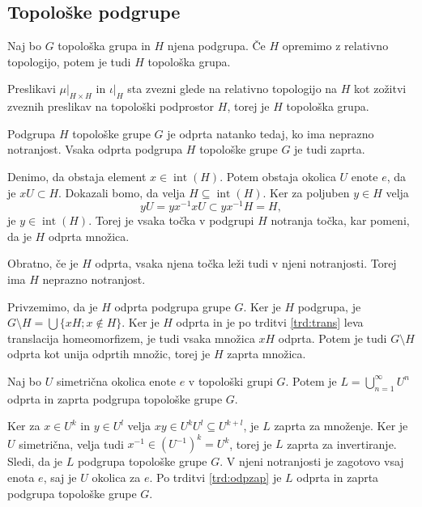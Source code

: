 \documentclass[mat1]{fmfdelo}
\DeclareMathOperator{\interior}{int}
\begin{document}
\subsection{Topološke podgrupe}

\begin{trditev}\label{trd:toppodgrupa}
Naj bo $G$ topološka grupa in $H$ njena podgrupa. Če $H$ opremimo z relativno topologijo, potem je tudi $H$ topološka grupa.
\end{trditev}

\begin{dokaz}
Preslikavi $\mu|_{H \times H}$ in $\iota|_H$ sta zvezni glede na relativno topologijo na $H$ kot zožitvi zveznih preslikav na topološki podprostor $H$, torej je $H$ topološka grupa.
\end{dokaz}


\begin{trditev}\label{trd:odpzap}
Podgrupa $H$ topološke grupe $G$ je odprta natanko tedaj, ko ima ne\-praz\-no not\-ran\-jost. Vsaka odprta podgrupa $H$ topološke grupe $G$ je tudi zaprta.
\end{trditev}

\begin{dokaz}
Denimo, da obstaja element $x \in \interior(H)$. Potem obstaja okolica $U$ enote $e$, da je $xU \subset H$. Dokazali bomo, da velja $H \subseteq \interior(H)$. Ker za poljuben $y \in H$ velja \[yU = yx^{-1}xU \subset yx^{-1}H = H,\] je $y \in \interior(H)$. Torej je vsaka točka v podgrupi $H$ notranja točka, kar pomeni, da je $H$ odprta množica.

Obratno, če je $H$ odprta, vsaka njena točka leži tudi v njeni notranjosti. Torej ima $H$ neprazno notranjost.

Privzemimo, da je $H$ odprta podgrupa grupe $G$. Ker je $H$ podgrupa, je $G\setminus H = \bigcup \lbrace xH ; x \notin H \rbrace$. Ker je $H$ odprta in je po trditvi \ref{trd:trans} leva translacija homeomorfizem, je tudi vsaka množica $xH$ odprta. Potem je tudi $G \setminus H$ odprta kot unija odprtih množic, torej je $H$ zaprta množica.
\end{dokaz}

\begin{trditev}\label{trd:podgrupaunija}
Naj bo $U$ simetrična okolica enote $e$ v topološki grupi $G$. Potem je $L = \bigcup_{n=1}^{\infty} U^n$ odprta in zaprta podgrupa topološke grupe $G$.
\end{trditev}

\begin{dokaz}
Ker za $x \in U^k$ in $y \in U^l$ velja $xy \in U^kU^l \subseteq U^{k+l}$, je $L$ zaprta za množenje. Ker je $U$ simetrična, velja tudi $x^{-1} \in (U^{-1})^k = U^k$, torej je $L$ zaprta za invertiranje. Sledi, da je $L$ podgrupa topološke grupe $G$. V njeni notranjosti je zagotovo vsaj enota $e$, saj je $U$ okolica za $e$. Po trditvi \ref{trd:odpzap} je $L$ odprta in zaprta podgrupa topološke grupe $G$.
\end{dokaz}
\end{document}

